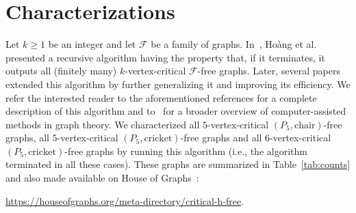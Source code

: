 \documentclass[10pt]{article}
\theoremstyle{definition}
\begin{document}
\vspace{-0.5cm}
\section{Characterizations}
\label{sec:characterizations}
Let $k \geq 1$ be an integer and let $\mathcal{F}$ be a family of graphs. In~\cite{HKLSS10}, Ho\`{a}ng et al. presented a recursive algorithm having the property that, if it terminates, it outputs all (finitely many) $k$-vertex-critical $\mathcal{F}$-free graphs. Later, several papers~\cite{GS18,GJORS26,XJGH25a,XJGH25b} extended this algorithm by further generalizing it and improving its efficiency. We refer the interested reader to the aforementioned references for a complete description of this algorithm and to~\cite{J25} for a broader overview of computer-assisted 
methods in graph theory. We characterized all $5$-vertex-critical $(P_5,\text{chair})$-free graphs, all $5$-vertex-critical $(P_5,\text{cricket})$-free graphs and all $6$-vertex-critical $(P_5,\text{cricket})$-free graphs by running this algorithm (i.e., the algorithm terminated in all these cases). These graphs are summarized in Table~\ref{tab:counts} and also made available on House of Graphs~\cite{CDG23}:
\begin{center}
\url{https://houseofgraphs.org/meta-directory/critical-h-free}.
\end{center}
\end{document}
